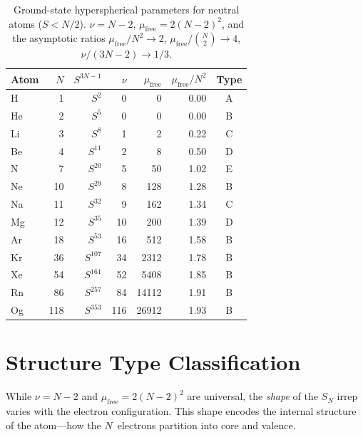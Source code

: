 \documentclass[aps,prl,twocolumn,superscriptaddress,longbibliography]{revtex4-2}
\newcommand{\mufree}{\mu_{\mathrm{free}}}
\begin{document}
\begin{table}[h]
\centering
\caption{Ground-state hyperspherical parameters for neutral atoms
($S < N/2$).  $\nu = N-2$, $\mufree = 2(N-2)^2$, and the asymptotic
ratios $\mufree/N^2 \to 2$, $\mufree/\binom{N}{2} \to 4$,
$\nu/(3N-2) \to 1/3$.}
\label{tab:mu_values}
\begin{tabular}{lrrrrrc}
\toprule
Atom & $N$ & $S^{3N-1}$ & $\nu$ & $\mufree$ & $\mufree/N^2$ & Type \\
\midrule
H     &   1 & $S^2$    &   0 &       0 & 0.00 & A \\
He    &   2 & $S^5$    &   0 &       0 & 0.00 & B \\
Li    &   3 & $S^8$    &   1 &       2 & 0.22 & C \\
Be    &   4 & $S^{11}$ &   2 &       8 & 0.50 & D \\
N     &   7 & $S^{20}$ &   5 &      50 & 1.02 & E \\
Ne    &  10 & $S^{29}$ &   8 &     128 & 1.28 & B \\
Na    &  11 & $S^{32}$ &   9 &     162 & 1.34 & C \\
Mg    &  12 & $S^{35}$ &  10 &     200 & 1.39 & D \\
Ar    &  18 & $S^{53}$ &  16 &     512 & 1.58 & B \\
Kr    &  36 & $S^{107}$&  34 &   2312 & 1.78 & B \\
Xe    &  54 & $S^{161}$&  52 &   5408 & 1.85 & B \\
Rn    &  86 & $S^{257}$&  84 &  14112 & 1.91 & B \\
Og    & 118 & $S^{353}$& 116 &  26912 & 1.93 & B \\
\bottomrule
\end{tabular}
\end{table}


\section{Structure Type Classification}
\label{sec:classification}

While $\nu = N - 2$ and $\mufree = 2(N-2)^2$ are universal, the
\emph{shape} of the $S_N$ irrep varies with the electron
configuration.  This shape encodes the internal structure of the
atom---how the $N$~electrons partition into core and valence.
\end{document}
